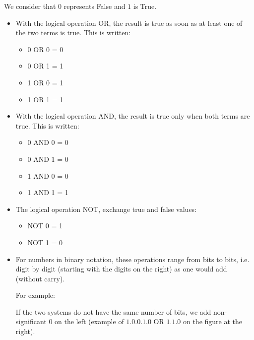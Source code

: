 \documentclass[11pt,class=report,crop=false]{standalone}
\begin{document}
\begin{cours}


We consider that $0$ represents \og{}False\fg{} and $1$ is \og{}True\fg{}. 
\begin{itemize}
  \item With the logical operation \og{}OR\fg{}, the result is true as soon as at least one of the two terms is true. This is written:
  \begin{itemize}
    \item 0 OR 0 = 0
    \item 0 OR 1 = 1
    \item 1 OR 0 = 1
    \item 1 OR 1 = 1
   \end{itemize}
   
  \item With the logical operation \og{}AND\fg{}, the result is true only when both terms are true. This is written:
  \begin{itemize}
    \item 0 AND 0 = 0
    \item 0 AND 1 = 0
    \item 1 AND 0 = 0
    \item 1 AND 1 = 1
   \end{itemize}  
   
  \item The logical operation \og{}NOT\fg{}, exchange true and false values:
  \begin{itemize}
    \item NOT 0 = 1
    \item NOT 1 = 0
   \end{itemize}
   
    \item For numbers in binary notation, these operations range from bits to bits, i.e. digit by digit (starting with the digits on the right) as one would add (without carry). 
    
 For example: 
    

If the two systems do not have the same number of bits, we add non-significant $0$ on the left (example of $1.0.0.1.0$ OR $1.1.0$ on the figure at the right).
\end{itemize}  
  
   

\end{cours}
\end{document}
